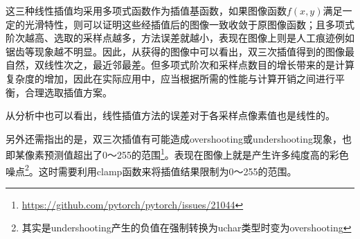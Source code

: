 \documentclass{article}
\begin{document}
这三种线性插值均采用多项式函数作为插值基函数，如果图像函数$f(x,y)$满足一定的光滑特性，则可以证明这些经插值后的图像一致收敛于原图像函数；且多项式阶次越高、选取的采样点越多，方法误差就越小，表现在图像上则是人工痕迹例如锯齿等现象越不明显。因此，从获得的图像中可以看出，双三次插值得到的图像最自然，双线性次之，最近邻最差。但多项式阶次和采样点数目的增长带来的是计算复杂度的增加，因此在实际应用中，应当根据所需的性能与计算开销之间进行平衡，合理选取插值方案。

从分析中也可以看出，线性插值方法的误差对于各采样点像素值也是线性的。

另外还需指出的是，双三次插值有可能造成overshooting或undershooting现象，也即某像素预测值超出了0～255的范围\footnote{\url{https://github.com/pytorch/pytorch/issues/21044}}。表现在图像上就是产生许多纯度高的彩色噪点\footnote{其实是undershooting产生的负值在强制转换为uchar类型时变为overshooting}。这时需要利用clamp函数来将插值结果限制为0～255的范围。

\setcounter{figure}{0}
\end{document}
